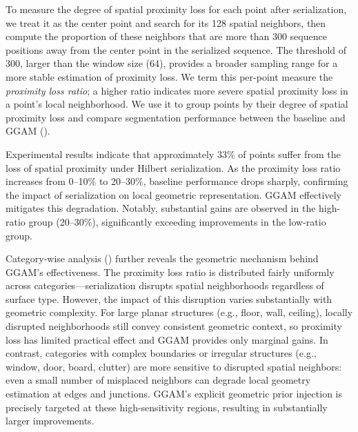 \documentclass[a4paper,fleqn]{cas-sc}
\begin{document}
To measure the degree of spatial proximity loss for each point after serialization, we treat it as the center point and search for its 128 spatial neighbors, then compute the proportion of these neighbors that are more than 300 sequence positions away from the center point in the serialized sequence. The threshold of 300, larger than the window size (64), provides a broader sampling range for a more stable estimation of proximity loss. We term this per-point measure the \textit{proximity loss ratio}; a higher ratio indicates more severe spatial proximity loss in a point's local neighborhood. We use it to group points by their degree of spatial proximity loss and compare segmentation performance between the baseline and GGAM ().

Experimental results indicate that approximately 33\% of points suffer from the loss of spatial proximity under Hilbert serialization. As the proximity loss ratio increases from 0--10\% to 20--30\%, baseline performance drops sharply, confirming the impact of serialization on local geometric representation. GGAM effectively mitigates this degradation. Notably, substantial gains are observed in the high-ratio group (20--30\%), significantly exceeding improvements in the low-ratio group.



Category-wise analysis () further reveals the geometric mechanism behind GGAM's effectiveness. The proximity loss ratio is distributed fairly uniformly across categories—serialization disrupts spatial neighborhoods regardless of surface type. However, the impact of this disruption varies substantially with geometric complexity. For large planar structures (e.g., floor, wall, ceiling), locally disrupted neighborhoods still convey consistent geometric context, so proximity loss has limited practical effect and GGAM provides only marginal gains. In contrast, categories with complex boundaries or irregular structures (e.g., window, door, board, clutter) are more sensitive to disrupted spatial neighbors: even a small number of misplaced neighbors can degrade local geometry estimation at edges and junctions. GGAM's explicit geometric prior injection is precisely targeted at these high-sensitivity regions, resulting in substantially larger improvements.
\end{document}
